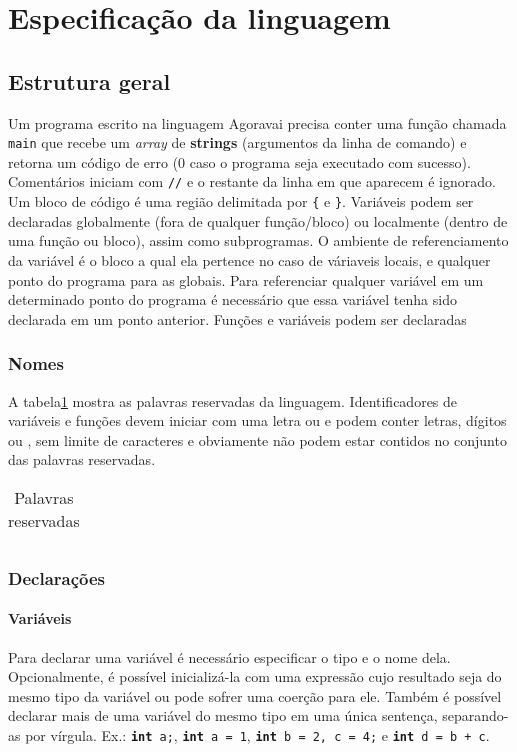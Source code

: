 \section{Especificação da linguagem}
\label{sec:estrutura-geral}

\subsection{Estrutura geral}
\label{subsec:estrutura-geral}
Um programa escrito na linguagem Agoravai precisa conter uma função chamada \texttt{main} que recebe um
\textit{array} de \textbf{strings} (argumentos da linha de comando) e retorna um código de erro (0 caso o programa
seja executado com sucesso).
Comentários iniciam com \texttt{//} e o restante da linha em que aparecem é ignorado.
Um bloco de código é uma região delimitada por \texttt{\{} e \texttt{\}}.
Variáveis podem ser declaradas globalmente (fora de qualquer função/bloco) ou localmente (dentro de uma função ou
bloco), assim como subprogramas.
O ambiente de referenciamento da variável é o bloco a qual ela pertence no caso de váriaveis locais, e qualquer
ponto do programa para as globais.
Para referenciar qualquer variável em um determinado ponto do programa é necessário que essa variável tenha sido
declarada em um ponto anterior. Funções e variáveis podem ser declaradas

\subsubsection{Nomes}
A tabela\ref{tab:palavras-reservadas} mostra as palavras reservadas da linguagem.
Identificadores de variáveis e funções devem iniciar com uma letra ou \texttt{\textunderscore} e podem conter
letras, dígitos ou \texttt{\textunderscore}, sem limite de caracteres e obviamente não podem estar contidos no
conjunto das palavras reservadas.
\begin{table}[]
    \centering
    \begin{tabular}{ccccc}
        
    \end{tabular}
    \caption{Palavras reservadas}
    \label{tab:palavras-reservadas}
\end{table}

\subsubsection{Declarações}
\label{sec:declaracoes}

\paragraph{Variáveis} Para declarar uma variável é necessário especificar o tipo e o nome dela.
Opcionalmente, é possível inicializá-la com uma expressão cujo resultado seja do mesmo tipo da variável ou pode
sofrer uma coerção para ele.
Também é possível declarar mais de uma variável do mesmo tipo em uma única sentença, separando-as por vírgula.
Ex.: \texttt{\textbf{int} a;}, \texttt{\textbf{int} a = 1}, \texttt{\textbf{int} b = 2, c = 4;} e
\texttt{\textbf{int} d = b + c}.

